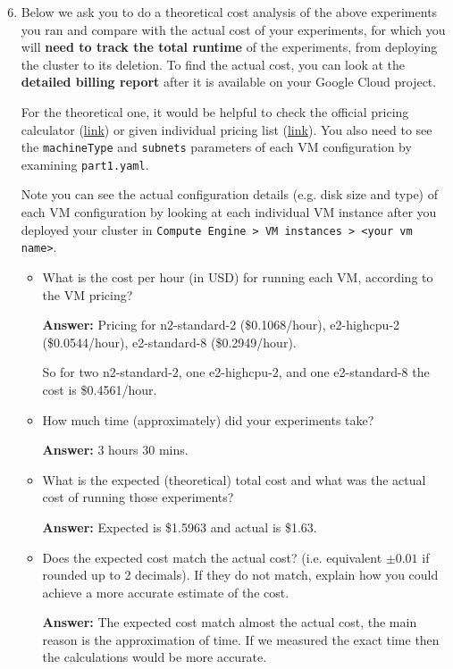     
\begin{enumerate}[label=(\alph*)]
    \setcounter{enumi}{5}
    
    \item Below we ask you to do a theoretical cost analysis of the above experiments you ran and compare with the actual cost of your experiments, for which you will \textbf{need to track the total runtime} of the experiments, from deploying the cluster to its deletion. To find the actual cost, you can look at the \textbf{detailed billing report} after it is available on your Google Cloud project. 

    For the theoretical one, it would be helpful to check the official pricing calculator (\href{https://cloud.google.com/products/calculator?hl=en}{link}) or given individual pricing list (\href{https://cloud.google.com/compute/all-pricing}{link}). You also need to see the \texttt{machineType} and \texttt{subnets} parameters of each VM configuration by examining \texttt{part1.yaml}. 
    
    Note you can see the actual configuration details (e.g. disk size and type) of each VM configuration by looking at each individual VM instance after you deployed your cluster in \texttt{Compute Engine > VM instances > <your vm name>}.

    \begin{itemize}
        \item What is the cost per hour (in USD) for running each VM, according to the VM pricing?

        \textbf{Answer:} Pricing for n2-standard-2 (\$0.1068/hour), e2-highcpu-2 (\$0.0544/hour), e2-standard-8 (\$0.2949/hour).

    So for two n2-standard-2, one e2-highcpu-2, and one e2-standard-8 the cost is \$0.4561/hour.
        \\

        \item How much time (approximately) did your experiments take? 

        \textbf{Answer:} 3 hours 30 mins.
        \\

        \item What is the expected (theoretical) total cost and what was the actual cost of running those experiments?
   
        \textbf{Answer:} Expected is \$1.5963 and actual is \$1.63.
        \\

        \item Does the expected cost match the actual cost? (i.e. equivalent $\pm 0.01$ if rounded up to 2 decimals). If they do not match, explain how you could achieve a more accurate estimate of the cost.
        
        \textbf{Answer:} The expected cost match almost the actual cost, the main reason is the approximation of time. If we measured the exact time then the calculations would be more accurate.
    \end{itemize}
            
\end{enumerate}

\newpage
